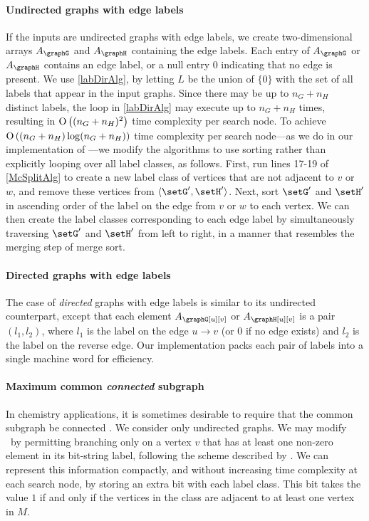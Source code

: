 \paragraph{Undirected graphs with edge labels} If the inputs are
undirected graphs with edge labels, we create two-dimensional
arrays $A_\graphG$ and $A_\graphH$ containing the edge labels.
Each entry of $A_\graphG$ or $A_\graphH$ contains an
edge label, or a null entry $0$ indicating that no edge is present.  We use \cref{labDirAlg}, by
letting $L$ be the union of $\{0\}$ with the set of all labels that appear in
the input graphs. Since there may be up to $n_G + n_H$ distinct labels, the loop in
\cref{labDirAlg} may execute up to $n_G + n_H$ times, resulting in $\operatorname{O}\left((n_G+n_H)^2\right)$
time complexity per search node.  To achieve $\operatorname{O}\left((n_G+n_H) \log (n_G+n_H)\right)$ time
complexity per search node---as we do in our implementation of \McSplit---we
modify the algorithms to use sorting rather
than explicitly looping over all label classes, as follows.  First, run lines
17-19 of \cref{McSplitAlg} to create a new label class of vertices that are
not adjacent to $v$ or $w$, and remove these vertices from $\langle \setG',\setH'
\rangle$.  Next, sort $\setG'$ and $\setH'$ in ascending order of the label on the edge
from $v$ or $w$ to each vertex. We can then create the label classes
corresponding to each edge label by simultaneously traversing $\setG'$ and $\setH'$
from left to right, in a manner that resembles the merging step of merge sort.

\paragraph{Directed graphs with edge labels} The case
of \emph{directed} graphs with edge labels is similar to its undirected
counterpart, except that each element $A_\graphG[u][v]$ or $A_\graphH[u][v]$ is a
pair $(l_1, l_2)$, where $l_1$ is the label on the edge $u \rightarrow v$ (or 0
if no edge exists) and $l_2$ is the label on the reverse edge.
Our implementation packs each pair of labels into a single machine word for efficiency.

\paragraph{Maximum common \emph{connected} subgraph} In chemistry applications,
it is sometimes desirable to require that the common subgraph be connected
\citep{Ehrlich:2011}. We consider only undirected graphs. We may modify \McSplit\ by
permitting branching only on a vertex $v$ that has at least one non-zero
element in its bit-string label, following the scheme described by
\citet{DBLP:conf/mco/VismaraV08}.  We can represent this information compactly,
and without increasing time complexity at each search node, by storing an extra
bit with each label class.  This bit takes the value $1$ if and only if the
vertices in the class are adjacent to at least one vertex in $M$.


